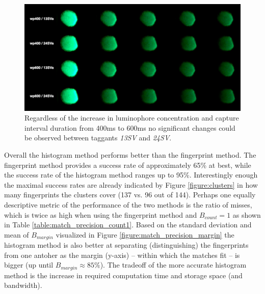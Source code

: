 \documentclass[thesis.tex]{subfiles}
\begin{document}
\begin{figure}[h!]
  \centering \includegraphics[page=1,width=\textwidth]{images/findings/SV}
  \caption{Regardless of the increase in luminophore concentration and capture interval duration from 400ms to 600ms no significant changes could be observed between taggants \emph{13SV} and \emph{24SV}.}
  \label{figure:SV}
\end{figure}

Overall the histogram method performs better than the fingerprint method. The fingerprint method provides a success rate of approximately 65\% at best, while the success rate of the histogram method ranges up to 95\%. Interestingly enough the maximal success rates are already indicated by Figure \ref{figure:clusters} in how many fingerprints the clusters cover (137 vs. 96 out of 144). Perhaps one equally descriptive metric of the performance of the two methods is the ratio of misses, which is twice as high when using the fingerprint method and $B_{count} = 1$ as shown in Table \ref{table:match_precision_count1}. Based on the standard deviation and mean of $B_{margin}$ visualized in Figure \ref{figure:match_precision_margin} the histogram method is also better at separating (distinguishing) the fingerprints from one antoher as the margin (y-axis) -- within which the matches fit -- is bigger (up until $B_{margin} \approx 85\%$). The tradeoff of the more accurate histogram method is the increase in required computation time and storage space (and bandwidth).
\end{document}
